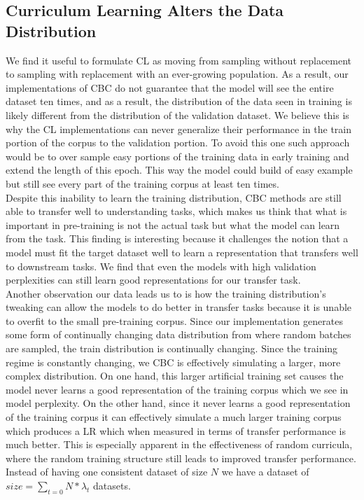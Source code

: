 \subsection{Curriculum Learning Alters the Data Distribution}
We find it useful to formulate CL as moving from sampling without replacement to sampling with replacement with an ever-growing population. As a result, our implementations of CBC do not guarantee that the model will see the entire dataset ten times, and as a result, the distribution of the data seen in training is likely different from the distribution of the validation dataset. We believe this is why the CL implementations can never generalize their performance in the train portion of the corpus to the validation portion. To avoid this one such approach would be to over sample easy portions of the training data in early training and extend the length of this epoch. This way the model could build of easy example but still see every part of the training corpus at least ten times. \\
Despite this inability to learn the training distribution, CBC methods are still able to transfer well to understanding tasks, which makes us think that what is important in pre-training is not the actual task but what the model can learn from the task. This finding is interesting because it challenges the notion that a model must fit the target dataset well to learn a representation that transfers well to downstream tasks. We find that even the models with high validation perplexities can still learn good representations for our transfer task. \\
Another observation our data leads us to is how the training distribution's tweaking can allow the models to do better in transfer tasks because it is unable to overfit to the small pre-training corpus. Since our implementation generates some form of continually changing data distribution from where random batches are sampled, the train distribution is continually changing. Since the training regime is constantly changing, we CBC is effectively simulating a larger, more complex distribution. On one hand, this larger artificial training set causes the model never learns a good representation of the training corpus which we see in model perplexity. On the other hand, since it never learns a good representation of the training corpus it can effectively simulate a much larger training corpus which produces a LR which when measured in terms of transfer performance is much better. This is especially apparent in the effectiveness of random curricula, where the random training structure still leads to improved transfer performance. Instead of having one consistent dataset of size $N$ we have a dataset of $size = \sum_{t=0} N * \lambda_t$ datasets.  \\
